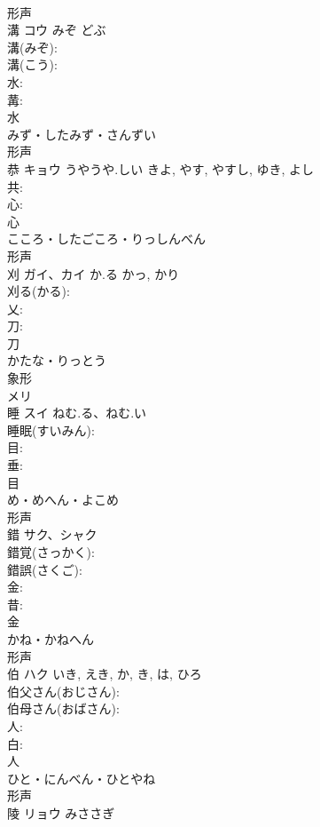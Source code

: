 \documentclass[8pt]{extreport}
\begin{document}
\begin{CJK}{UTF8}{min}
\\	形声 
\\	溝	コウ	みぞ	どぶ	
\\	溝(みぞ): 
\\	溝(こう): 
\\	水: 
\\	冓: 
\\	水	
\\	みず・したみず・さんずい	
\\	形声 
\\	恭	キョウ	うやうや.しい	きよ, やす, やすし, ゆき, よし	
\\	共: 
\\	心: 
\\	心	
\\	こころ・したごころ・りっしんべん	
\\	形声 
\\	刈	ガイ、カイ	か.る	かっ, かり	
\\	刈る(かる): 
\\	乂: 
\\	刀: 
\\	刀	
\\	かたな・りっとう	
\\	象形 
\\	メリ
\\	睡	スイ	ねむ.る、ねむ.い		
\\	睡眠(すいみん): 
\\	目: 
\\	垂: 
\\	目	
\\	め・めへん・よこめ	
\\	形声 
\\	錯	サク、シャク			
\\	錯覚(さっかく): 
\\	錯誤(さくご): 
\\	金: 
\\	昔: 
\\	金	
\\	かね・かねへん	
\\	形声 
\\	伯	ハク		いき, えき, か, き, は, ひろ	
\\	伯父さん(おじさん): 
\\	伯母さん(おばさん): 
\\	人: 
\\	白: 
\\	人	
\\	ひと・にんべん・ひとやね	
\\	形声 
\\	陵	リョウ	みささぎ		

\end{CJK}
\end{document}
